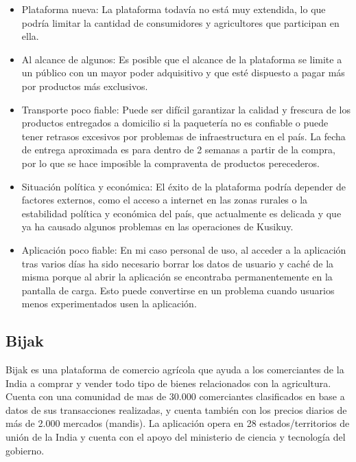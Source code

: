 \begin{itemize}

	\item Plataforma nueva: La plataforma todavía no está muy extendida, lo que podría limitar la cantidad de consumidores y agricultores que participan en ella.

	\item Al alcance de algunos: Es posible que el alcance de la plataforma se limite a un público con un mayor poder adquisitivo y que esté dispuesto a pagar más por productos más exclusivos.
	
	\item Transporte poco fiable: Puede ser difícil garantizar la calidad y frescura de los productos entregados a domicilio si la paquetería no es confiable o puede tener retrasos excesivos por problemas de infraestructura en el país. La fecha de entrega aproximada es para dentro de 2 semanas a partir de la compra, por lo que se hace imposible la compraventa de productos perecederos.
	
	\item Situación política y económica: El éxito de la plataforma podría depender de factores externos, como el acceso a internet en las zonas rurales o la estabilidad política y económica del país, que actualmente es delicada y que ya ha causado algunos problemas en las operaciones de Kusikuy.

	\item Aplicación poco fiable: En mi caso personal de uso, al acceder a la aplicación tras varios días ha sido necesario borrar los datos de usuario y caché de la misma porque al abrir la aplicación se encontraba permanentemente en la pantalla de carga. Esto puede convertirse en un problema cuando usuarios menos experimentados usen la aplicación.

\end{itemize}

\subsection{Bijak}

Bijak es una plataforma de comercio agrícola que ayuda a los comerciantes de la India a comprar y vender todo tipo de bienes relacionados con la agricultura. Cuenta con una comunidad de mas de 30.000 comerciantes clasificados en base a datos de sus transacciones realizadas, y cuenta también con los precios diarios de más de 2.000 mercados (mandis). La aplicación opera en 28 estados/territorios de unión de la India y cuenta con el apoyo del ministerio de ciencia y tecnología del gobierno.

